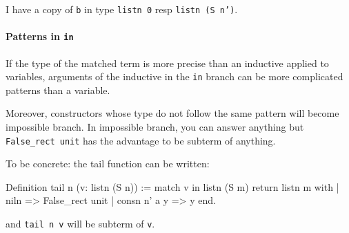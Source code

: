 I have a copy of {\tt b} in type {\tt listn 0} resp {\tt listn (S n')}.



\paragraph{Patterns in {\tt in}}
If the type of the matched term is more precise than an inductive applied to
variables, arguments of the inductive in the {\tt in} branch can be more
complicated patterns than a variable.

Moreover, constructors whose type do not follow the same pattern will become
impossible branch. In impossible branch, you can answer anything but {\tt
  False\_rect unit} has the advantage to be subterm of anything.

To be concrete: the tail function can be written:
\begin{coq_example}
  Definition tail n (v: listn (S n)) :=
    match v in listn (S m) return listn m with
      | niln => False_rect unit
      | consn n' a y => y
    end.
\end{coq_example}
and {\tt tail n v} will be subterm of {\tt v}.

